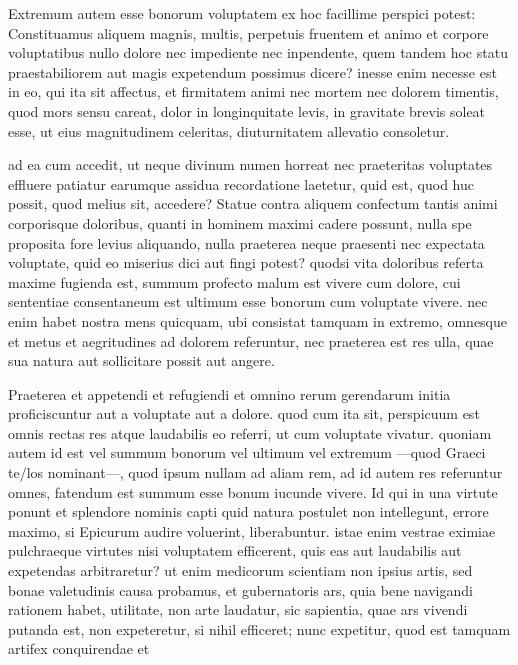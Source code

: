  Extremum autem esse bonorum voluptatem ex hoc facillime perspici potest: Constituamus aliquem magnis, multis, perpetuis fruentem et animo et corpore voluptatibus nullo dolore nec impediente nec inpendente, quem tandem hoc statu praestabiliorem aut magis expetendum possimus dicere? inesse enim necesse est in eo, qui ita sit affectus, et firmitatem animi nec mortem nec dolorem timentis, quod mors sensu careat, dolor in longinquitate levis, in gravitate brevis soleat esse, ut eius magnitudinem celeritas, diuturnitatem allevatio consoletur.

 ad ea cum accedit, ut neque divinum numen horreat nec praeteritas voluptates effluere patiatur earumque assidua recordatione laetetur, quid est, quod huc possit, quod melius sit, accedere? Statue contra aliquem confectum tantis animi corporisque doloribus, quanti in hominem maximi cadere possunt, nulla spe proposita fore levius aliquando, nulla praeterea neque praesenti nec expectata voluptate, quid eo miserius dici aut fingi potest? quodsi vita doloribus referta maxime fugienda est, summum profecto malum est vivere cum dolore, cui sententiae consentaneum est ultimum esse bonorum cum voluptate vivere. nec enim habet nostra mens quicquam, ubi consistat tamquam in extremo, omnesque et metus et aegritudines ad dolorem referuntur, nec praeterea est res ulla, quae sua natura aut sollicitare possit aut angere.

 Praeterea et appetendi et refugiendi et omnino rerum gerendarum initia proficiscuntur aut a voluptate aut a dolore. quod cum ita sit, perspicuum est omnis rectas res atque laudabilis eo referri, ut cum voluptate vivatur. quoniam autem id est vel summum bonorum vel ultimum vel extremum —quod Graeci te/los nominant—, quod ipsum nullam ad aliam rem, ad id autem res referuntur omnes, fatendum est summum esse bonum iucunde vivere. Id qui in una virtute ponunt et splendore nominis capti quid natura postulet non intellegunt, errore maximo, si Epicurum audire voluerint, liberabuntur. istae enim vestrae eximiae pulchraeque virtutes nisi voluptatem efficerent, quis eas aut laudabilis aut expetendas arbitraretur? ut enim medicorum scientiam non ipsius artis, sed bonae valetudinis causa probamus, et gubernatoris ars, quia bene navigandi rationem habet, utilitate, non arte laudatur, sic sapientia, quae ars vivendi putanda est, non expeteretur, si nihil efficeret; nunc expetitur, quod est tamquam artifex conquirendae et

